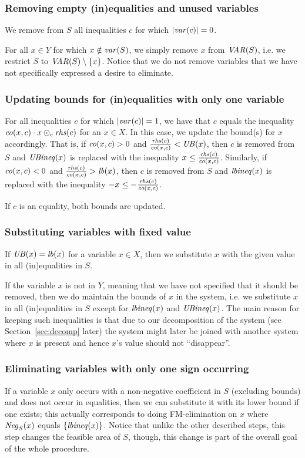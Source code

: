 \subsubsection{Removing empty (in)equalities and unused variables}\label{para:emptyIneqs} 
We remove from $S$ all inequalities $c$ for which $|\mathit{var}(c)| = 0$. %

For all $x\in Y$ for which $x \notin \mathit{var}(S)$, we simply remove $x$ from $\mathit{VAR}(S)$, i.e. we restrict $S$ to $\mathit{VAR}(S)\setminus\{x\}$. Notice that we do not remove variables that we have not specifically expressed a desire to eliminate.
%	
\subsubsection{Updating bounds for (in)equalities with only one variable}\label{para:singleton} For all inequalities $c$ for which $|\mathit{var}(c)|=1$, we have that $c$ equals the inequality  $\mathit{co}(x,c)\cdot x \odot_c \mathit{rhs}(c)$ for an $x\in X$. In this case, we update the bound(s) for $x$ accordingly. That is, if $\mathit{co}(x,c)>0$ and $\frac{\mathit{rhs}(c)}{\mathit{co}(x,c)}<\mathit{UB}(x)$, then $c$ is removed from $S$ and $\mathit{UBineq}(x)$ is replaced with the inequality $x \leq \frac{\mathit{rhs}(c)}{\mathit{co}(x,c)}$.  
Similarly, if $\mathit{co}(x,c)<0$ and $\frac{\mathit{rhs}(c)}{\mathit{co}(x,c)}> \mathit{lb}(x)$, then $c$ is removed from $S$ and $\mathit{lbineq}(x)$ is replaced with the inequality $-x \leq - \frac{\mathit{rhs}(c)}{\mathit{co}(x,c)}$. 

If $c$ is an equality, both bounds are updated. 
%
\subsubsection{Substituting variables with fixed value}\label{para:fixed} If $\mathit{UB}(x) = \mathit{lb}(x)$ for a variable $x\in X$, then we substitute $x$ with the given value in all (in)equalities in $S$. 

If the variable $x$ is not in $Y$, meaning that we have not specified that it should be removed, then we do maintain the bounds of $x$ in the system, i.e. we substitute $x$ in all (in)equalities in $S$ except for $\mathit{lbineq}(x)$ and $\mathit{UBineq}(x)$. The main reason for keeping such inequalities is that due to our decomposition of the system (see Section~\ref{sec:decomp} later) the system might later be joined with another system where $x$ is present and hence $x$'s value should not ``disappear''. 
%
\subsubsection{Eliminating variables with only one sign occurring}\label{para:oneSign} If a variable $x$ only occurs with a non-negative coefficient in $S$ (excluding bounds) and does not occur in equalities, then we can substitute it with its lower bound if one exists; this actually corresponds to doing FM-elimination on $x$ where $\mathit{Neg}_S(x)$ equals $\{\mathit{lbineq}(x)\}$. Notice that unlike the other described steps, this step changes the feasible area of $S$, though, this change is part of the overall goal of the whole procedure. 

